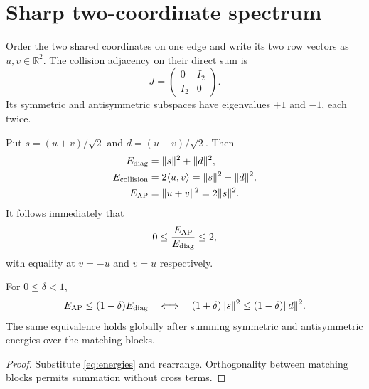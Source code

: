 \section{Sharp two-coordinate spectrum}

Order the two shared coordinates on one edge and write its two row vectors as
$u,v\in\mathbb R^2$.  The collision adjacency on their direct sum is
\begin{equation}
 J=\begin{pmatrix}0&I_2\\I_2&0\end{pmatrix}.
 \label{eq:swap}
\end{equation}
Its symmetric and antisymmetric subspaces have eigenvalues $+1$ and $-1$, each twice.

Put $s=(u+v)/\sqrt2$ and $d=(u-v)/\sqrt2$.  Then
\begin{align}
 E_{\rm diag}&=\|s\|^2+\|d\|^2,\\
 E_{\rm collision}&=2\langle u,v\rangle=\|s\|^2-\|d\|^2,\\
 E_{\rm AP}&=\|u+v\|^2=2\|s\|^2.
 \label{eq:energies}
\end{align}
It follows immediately that
\begin{equation}
 0\le \frac{E_{\rm AP}}{E_{\rm diag}}\le2,
 \label{eq:ratio}
\end{equation}
with equality at $v=-u$ and $v=u$ respectively.

\begin{theorem}
For $0\le\delta<1$,
\begin{equation}
 E_{\rm AP}\le(1-\delta)E_{\rm diag}
 \quad\Longleftrightarrow\quad
 (1+\delta)\|s\|^2\le(1-\delta)\|d\|^2.
 \label{eq:criterion}
\end{equation}
The same equivalence holds globally after summing symmetric and antisymmetric energies
over the matching blocks.
\end{theorem}

\begin{proof}
Substitute \eqref{eq:energies} and rearrange.  Orthogonality between matching blocks
permits summation without cross terms.
\end{proof}
